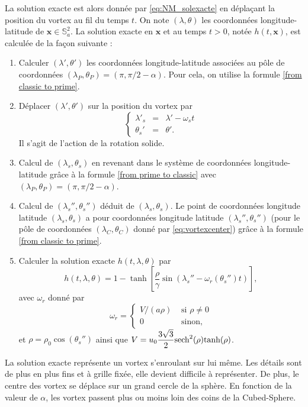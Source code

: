 La solution exacte est alors donnée par \eqref{eq:NM_solexacte} en déplaçant la position du vortex au fil du temps $t$. On note $(\lambda, \theta)$ les coordonnées longitude-latitude de $\mathbf{x} \in \mathbb{S}_a^2$.
La solution exacte en $\mathbf{x}$ et au temps $t>0$, notée $h(t,\mathbf{x})$, est calculée de la façon suivante :
\begin{enumerate}
\item Calculer $(\lambda', \theta')$ les coordonnées longitude-latitude associées au pôle de coordonnées $(\lambda_P, \theta_P) = (\pi, \pi/2 - \alpha)$. Pour cela, on utilise la formule \eqref{from classic to prime}.

\item Déplacer $(\lambda', \theta')$ sur la position du vortex par
\begin{equation}
\left\lbrace
\begin{array}{rcl}
\lambda'_s & = & \lambda' - \omega_s t \\
\theta_s' & = & \theta'.
\end{array}
\right.
\label{eq:vortexcenter}
\end{equation}
Il s'agit de l'action de la rotation solide.

\item Calcul de $(\lambda_s, \theta_s)$ en revenant dans le système de coordonnées longitude-latitude grâce à la formule \eqref{from prime to classic} avec $(\lambda_P, \theta_P) = (\pi, \pi/2 - \alpha)$.

\item Calcul de $(\lambda_s'', \theta_s'')$ déduit de $(\lambda_s, \theta_s)$. Le point de coordonnées longitude latitude $(\lambda_s, \theta_s)$ a pour coordonnées longitude latitude $(\lambda_s'', \theta_s'')$ (pour le pôle de coordonnées $(\lambda_C, \theta_C)$ donné par \eqref{eq:vortexcenter}) grâce à la formule \eqref{from classic to prime}.

\item Calculer la solution exacte $h(t,\lambda, \theta)$ par
\begin{equation}
h(t,\lambda, \theta) = 1 - \tanh \left[ \dfrac{\rho}{\gamma} \sin (\lambda_s'' - \omega_r(\theta_s'')t) \right],
\label{eq:NJ_solexacte}
\end{equation}
avec $\omega_r$ donné par
\begin{equation}
\omega_r = \left\lbrace
\begin{array}{cl}
V/(a \rho) & \text{ si } \rho \neq 0 \\
0 & \text{ sinon,}
\end{array}
\right.
\end{equation}
et $\rho = \rho_0 \cos (\theta_s'')$ ainsi que $V = u_0 \dfrac{3\sqrt{3}}{2} \text{sech}^2(\rho) \text{tanh}(\rho)$.
\end{enumerate}
La solution exacte représente un vortex s'enroulant sur lui même. Les détails sont de plus en plus fins et à grille fixée, elle devient difficile à représenter. De plus, le centre des vortex se déplace sur un grand cercle de la sphère. En fonction de la valeur de $\alpha$, les vortex passent plus ou moins loin des coins de la Cubed-Sphere.

